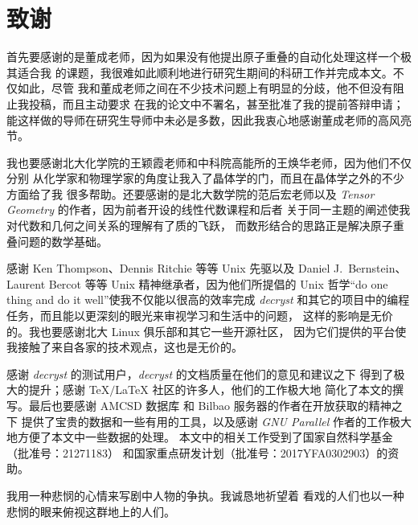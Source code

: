 
\chapter{致谢}

首先要感谢的是董成老师，因为如果没有他提出原子重叠的自动化处理这样一个极其适合我
的课题，我很难如此顺利地进行研究生期间的科研工作并完成本文。不仅如此，尽管
我和董成老师之间在不少技术问题上有明显的分歧，他不但没有阻止我投稿，而且主动要求
在我的论文\parencite{liu2017, liu2018}中不署名，甚至批准了我的提前答辩申请；
能这样做的导师在研究生导师中未必是多数，因此我衷心地感谢董成老师的高风亮节。

我也要感谢北大化学院的王颖霞老师和中科院高能所的王焕华老师，因为他们不仅分别
从化学家和物理学家的角度让我入了晶体学的门，而且在晶体学之外的不少方面给了我
很多帮助。还要感谢的是北大数学院的范后宏老师以及 \emph{Tensor Geometry}%
\parencite{dodson1991}的作者，因为前者开设的线性代数课程和后者
关于同一主题的阐述使我对代数和几何之间关系的理解有了质的飞跃，
而数形结合的思路正是解决原子重叠问题的数学基础。

感谢 Ken Thompson、Dennis Ritchie 等等 Unix 先驱以及 Daniel J.\ Bernstein、%
Laurent Bercot 等等 Unix 精神继承者，因为他们所提倡的 Unix 哲学“do one thing
and do it well”\parencite{salus1994}使我不仅能以很高的效率完成 \emph{decryst}
和其它的项目中的编程任务，而且能以更深刻的眼光来审视学习和生活中的问题，
这样的影响是无价的。我也要感谢北大 Linux 俱乐部和其它一些开源社区，
因为它们提供的平台使我接触了来自各家的技术观点，这也是无价的。

感谢 \emph{decryst} 的测试用户，\emph{decryst} 的文档质量在他们的意见和建议之下
得到了极大的提升；感谢 \TeX{}$\big/$\LaTeX{} 社区的许多人，他们的工作极大地
简化了本文的撰写。最后也要感谢 AMCSD 数据库\parencite{downs2003}%
和 Bilbao 服务器\parencite{aroyo2006}的作者在开放获取的精神之下
提供了宝贵的数据和一些有用的工具，以及感谢 \emph{GNU Parallel}%
\parencite{tange2011}作者的工作极大地方便了本文中一些数据的处理。
本文中的相关工作受到了国家自然科学基金（批准号：21271183）
和国家重点研发计划（批准号：2017YFA0302903）的资助。

\begin{rquote}{0.2\textwidth}
	我用一种悲悯的心情来写剧中人物的争执。我诚恳地祈望着
	看戏的人们也以一种悲悯的眼来俯视这群地上的人们。
\end{rquote}

